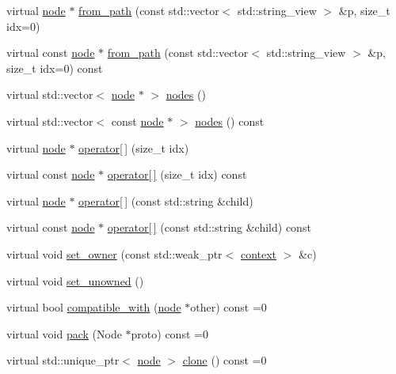 \begin{DoxyCompactItemize}
virtual \hyperlink{classtelegraph_1_1node}{node} $\ast$ \hyperlink{classtelegraph_1_1node_a2d5ea5366a04f3b3841de9bc21e70416}{from\+\_\+path} (const std\+::vector$<$ std\+::string\+\_\+view $>$ \&p, size\+\_\+t idx=0)
\item 
virtual const \hyperlink{classtelegraph_1_1node}{node} $\ast$ \hyperlink{classtelegraph_1_1node_aaba33e2aa28a99dcd8f4b1888c3a5706}{from\+\_\+path} (const std\+::vector$<$ std\+::string\+\_\+view $>$ \&p, size\+\_\+t idx=0) const
\item 
virtual std\+::vector$<$ \hyperlink{classtelegraph_1_1node}{node} $\ast$ $>$ \hyperlink{classtelegraph_1_1node_a14eb2051c1efaf4de6684d3e50aebeb7}{nodes} ()
\item 
virtual std\+::vector$<$ const \hyperlink{classtelegraph_1_1node}{node} $\ast$ $>$ \hyperlink{classtelegraph_1_1node_a9d19888a9a73a4623dcab55be6386395}{nodes} () const
\item 
virtual \hyperlink{classtelegraph_1_1node}{node} $\ast$ \hyperlink{classtelegraph_1_1node_ad82c9a9af7b7cf132db1c1e74f09254f}{operator\mbox{[}$\,$\mbox{]}} (size\+\_\+t idx)
\item 
virtual const \hyperlink{classtelegraph_1_1node}{node} $\ast$ \hyperlink{classtelegraph_1_1node_a4a2a451694b0a4b2c4ec26eee02e46ad}{operator\mbox{[}$\,$\mbox{]}} (size\+\_\+t idx) const
\item 
virtual \hyperlink{classtelegraph_1_1node}{node} $\ast$ \hyperlink{classtelegraph_1_1node_a3cf657c57fe639f6288f2acdd9b50e3c}{operator\mbox{[}$\,$\mbox{]}} (const std\+::string \&child)
\item 
virtual const \hyperlink{classtelegraph_1_1node}{node} $\ast$ \hyperlink{classtelegraph_1_1node_aad6b0bbccc9831f82117a1cc03493f6c}{operator\mbox{[}$\,$\mbox{]}} (const std\+::string \&child) const
\item 
virtual void \hyperlink{classtelegraph_1_1node_a6d864584bfadd3520194066f8b62812b}{set\+\_\+owner} (const std\+::weak\+\_\+ptr$<$ \hyperlink{classtelegraph_1_1context}{context} $>$ \&c)
\item 
virtual void \hyperlink{classtelegraph_1_1node_ac0bbcb9d810a2cca87b120301c0972a0}{set\+\_\+unowned} ()
\item 
virtual bool \hyperlink{classtelegraph_1_1node_a68c4aed1434da1f0ece9089ff99ffcdb}{compatible\+\_\+with} (\hyperlink{classtelegraph_1_1node}{node} $\ast$other) const =0
\item 
virtual void \hyperlink{classtelegraph_1_1node_a5006b21e9b83ecd52f3f953a1b828773}{pack} (Node $\ast$proto) const =0
\item 
virtual std\+::unique\+\_\+ptr$<$ \hyperlink{classtelegraph_1_1node}{node} $>$ \hyperlink{classtelegraph_1_1node_ae90515f4573cfa43c168cba9d542df6b}{clone} () const =0
\end{DoxyCompactItemize}
